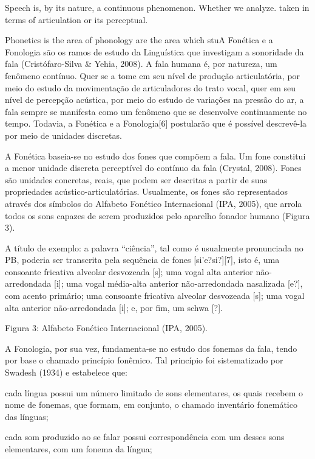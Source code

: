 Speech is, by its nature, a continuous phenomenon. Whether we analyze. taken in terms of articulation or its perceptual. 


Phonetics is the area of  phonology are the area which stuA Fon\'etica e a Fonologia s\~ao os ramos de estudo da Lingu\'istica que
investigam a sonoridade da fala (Crist\'ofaro-Silva \& Yehia, 2008). A
fala humana \'e, por natureza, um fen\^omeno cont\'inuo. Quer se a tome em seu
n\'ivel de produ\c{c}\~ao articulat\'oria, por meio do estudo da movimenta\c{c}\~ao de
articuladores do trato vocal, quer em seu n\'ivel de percep\c{c}\~ao ac\'ustica,
por meio do estudo de varia\c{c}\~oes na press\~ao do ar, a fala sempre se
manifesta como um fen\^omeno que se desenvolve continuamente no tempo.
Todavia, a Fon\'etica e a Fonologia{[}6{]} postular\~ao que \'e poss\'ivel
descrev\^e-la por meio de unidades discretas.

A Fon\'etica baseia-se no estudo dos fones que comp\~oem a fala. Um fone
constitui a menor unidade discreta percept\'ivel do cont\'inuo da fala
(Crystal, 2008). Fones s\~ao unidades concretas, reais, que podem ser
descritas a partir de suas propriedades ac\'ustico-articulat\'orias.
Usualmente, os fones s\~ao representados atrav\'es dos s\'imbolos do Alfabeto
Fon\'etico Internacional (IPA, 2005), que arrola todos os sons capazes de
serem produzidos pelo aparelho fonador humano (Figura 3).

A t\'itulo de exemplo: a palavra ``ci\^encia'', tal como \'e usualmente
pronunciada no PB, poderia ser transcrita pela sequ\^encia de fones
{[}si'e?si?{]}{[}7{]}, isto \'e, uma consoante fricativa alveolar
desvozeada {[}s{]}; uma vogal alta anterior n\~ao-arredondada {[}i{]}; uma
vogal m\'edia-alta anterior n\~ao-arredondada nasalizada {[}e?{]}, com
acento prim\'ario; uma consoante fricativa alveolar desvozeada {[}s{]};
uma vogal alta anterior n\~ao-arredondada {[}i{]}; e, por fim, um schwa
{[}?{]}.


Figura 3: Alfabeto Fon\'etico Internacional (IPA, 2005).

A Fonologia, por sua vez, fundamenta-se no estudo dos fonemas da fala,
tendo por base o chamado princ\'ipio fon\^emico. Tal princ\'ipio foi
sistematizado por Swadesh (1934) e estabelece que:

cada l\'ingua possui um n\'umero limitado de sons elementares, os quais
recebem o nome de fonemas, que formam, em conjunto, o chamado invent\'ario
fonem\'atico das l\'inguas;

cada som produzido ao se falar possui correspond\^encia com um desses sons
elementares, com um fonema da l\'ingua;

